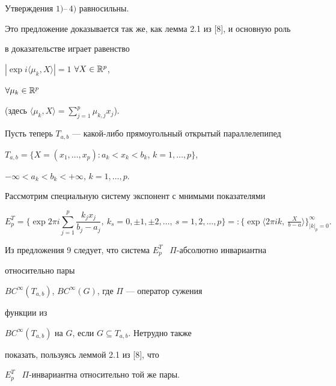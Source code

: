 \begin{prop}


Утверждения $1)$--\,$4)$ равносильны.


\end{prop}





Это предложение доказывается так же, как лемма 2.1 из [8], и основную роль


в доказательстве играет равенство


$|\exp i\langle\mu_k,X\rangle|=1$ \; $\forall X\in\Bbb{R}^p$,


$\forall \mu_k\in\Bbb{R}^p$


(здесь $\langle\mu_k,X\rangle =\sum\limits_{j=1}^p\mu_{k,j}x_j$).





Пусть теперь $T_{a,b}$ --- какой-либо прямоугольный открытый параллелепипед


$T_{a,b}=\{X=(x_1,\dotsc,x_p):a_k<x_k<b_k$, $k=1,\dotsc,p\}$,


$-\infty<a_k<b_k<+\infty$, $k=1,\dotsc,p$.





Рассмотрим специальную систему экспонент с мнимыми показателями


$$


E^T_p=\bigg\{\exp 2\pi i\sum_{j=1}^p\frac{k_jx_j}{b_j-a_j},


\ k_s=0,\pm 1,\pm 2,\dotsc, \ s=1,2,\dots,p\bigg\}=:


\big\{\exp\big\langle


2\pi ik,\ \tfrac{X}{b-a}\big\rangle\big\}^{\infty}_{|k|_p=0}.


$$





Из предложения 9 следует, что система $E^T_p$ \ $\Pi$-абсолютно инвариантна


относительно пары


$BC^\infty(T_{a,b})$, $BC^\infty(G)$, где $\Pi$ --- оператор сужения


функции из


$BC^\infty(T_{a,b})$ на $G$, если $G\subseteq T_{a,b}$. Нетрудно также


показать, пользуясь леммой 2.1 из [8], что


$E_p^T$ \ $\Pi$-инвариантна относительно той же пары.





